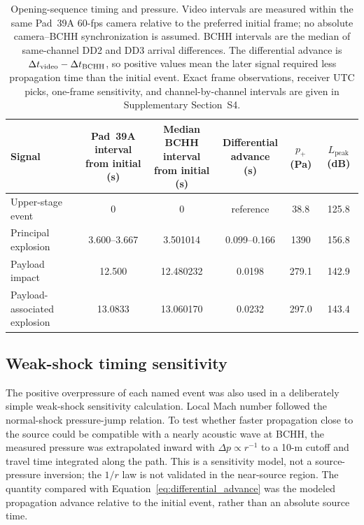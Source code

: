 \documentclass[]{seismica}
\begin{document}
\begin{table}[!tbp]
\caption{Opening-sequence timing and pressure. Video intervals are measured
within the same Pad~39A 60-fps camera relative to the preferred initial frame;
no absolute camera--BCHH synchronization is assumed. BCHH intervals are the
median of same-channel DD2 and DD3 arrival differences. The differential
advance is $\Delta t_{\rm video}-\Delta t_{\rm BCHH}$, so positive values mean
the later signal required less propagation time than the initial event.
Exact frame observations, receiver UTC picks, one-frame sensitivity, and
channel-by-channel intervals are given in Supplementary Section~S4.}
\label{tab:principal_events}
\centering
\small
\begin{tabularx}{\textwidth}{Xccccc}
\hline
Signal &
\shortstack{Pad~39A interval\\from initial (s)} &
\shortstack{Median BCHH interval\\from initial (s)} &
\shortstack{Differential\\advance (s)} &
$p_+$ (Pa) &
\shortstack{$L_{\mathrm{peak}}$\\(dB)} \\
\hline
Upper-stage event & 0 & 0 & reference & 38.8 & 125.8 \\
Principal explosion & 3.600--3.667 & 3.501014 & 0.099--0.166 & 1390 & 156.8 \\
Payload impact & 12.500 & 12.480232 & 0.0198 & 279.1 & 142.9 \\
Payload-associated explosion & 13.0833 & 13.060170 & 0.0232 & 297.0 & 143.4 \\
\hline
\end{tabularx}
\end{table}

\subsection{Weak-shock timing sensitivity}

The positive overpressure of each named event was also used in a deliberately
simple weak-shock sensitivity calculation. Local Mach number followed the
normal-shock pressure-jump relation. To test whether faster propagation close
to the source could be compatible with a nearly acoustic wave at BCHH, the
measured pressure was extrapolated inward with $\Delta p\propto r^{-1}$ to a
10-m cutoff and travel time integrated along the path. This is a sensitivity
model, not a source-pressure inversion; the $1/r$ law is not validated in the
near-source region. The quantity compared with Equation~\ref{eq:differential_advance}
was the modeled propagation advance relative to the initial event, rather than
an absolute source time.
\end{document}
